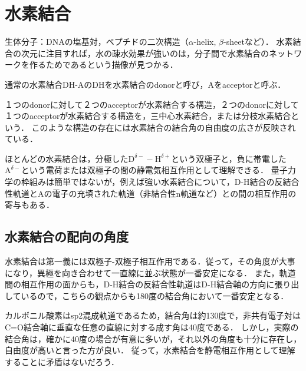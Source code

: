 \documentclass[uplatex, dvipdfmx]{jsreport}
\begin{document}
\section{水素結合}\label{section-HB}
生体分子：DNAの塩基対，ペプチドの二次構造（$\alpha$-helix, $\beta$-sheetなど）．
水素結合の次元に注目すれば，水の疎水効果が強いのは，分子間で水素結合のネットワークを作るためであるという描像が見つかる．

\begin{notation}
    通常の水素結合DH-AのDHを水素結合のdonorと呼び，Aをacceptorと呼ぶ．
\end{notation}
\begin{definition}
    １つのdonorに対して２つのacceptorが水素結合する構造，２つのdonorに対して１つのacceptorが水素結合する構造を，三中心水素結合，または分枝水素結合という．
    このような構造の存在には水素結合の結合角の自由度の広さが反映されている．
\end{definition}

\begin{theory}
    ほとんどの水素結合は，分極した$\mathrm{D}^{\delta-}-\mathrm{H}^{\delta+}$という双極子と，負に帯電した$\mathrm{A}^{\delta-}$という電荷または双極子の間の静電気相互作用として理解できる．
    量子力学の枠組みは簡単ではないが，例えば強い水素結合について，D-H結合の反結合性軌道とAの電子の充填された軌道（非結合性n軌道など）との間の相互作用の寄与もある．
\end{theory}

\subsection{水素結合の配向の角度}

水素結合は第一義には双極子-双極子相互作用である．従って，その角度が大事になり，異極を向き合わせて一直線に並ぶ状態が一番安定になる．
また，軌道間の相互作用の面からも，D-H結合の反結合性軌道はD-H結合軸の方向に張り出しているので，こちらの観点からも180度の結合角において一番安定となる．

\begin{fact}
    カルボニル酸素はsp2混成軌道であるため，結合角は約130度で，非共有電子対はC=O結合軸に垂直な任意の直線に対する成す角は40度である．
    しかし，実際の結合角は，確かに40度の場合が有意に多いが，それ以外の角度も十分に存在し，自由度が高いと言った方が良い．
    従って，水素結合を静電相互作用として理解することに矛盾はないだろう．
\end{fact}
\end{document}
